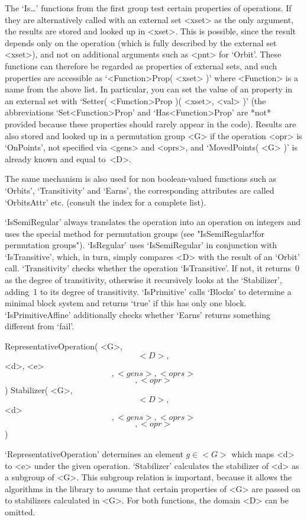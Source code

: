 The `Is\dots'  functions from the first group  test certain properties of
operations. If they are alternatively called  with an external set <xset>
as the only  argument, the results are   stored and looked up  in <xset>.
This is possible,  since the result depends  only on the operation (which
is fully  described by the  external set  <xset>),  and not on additional
arguments such as <pnt>   for `Orbit'. These  functions can  therefore be
regarded as properties of  external sets, and  such {\GAP} properties are
accessible as `<Function>Prop( <xset> )'  where <Function> is a name from
the above list. In particular, you can set the value of an property in an
external   set with `Setter( <Function>Prop    )( <xset>,  <val> )'  (the
abbreviations    `Set<Function>Prop'  and `Has<Function>Prop'   are *not*
provided because these properties   should rarely  appear in  the  code).
Results are also  stored and looked up in  a permutation group <G> if the
operation  <opr> is `OnPoints', not  specified via <gens> and <oprs>, and
`MovedPoints( <G> )' is already known and equal to~<D>.

The same mechanism is also used  for non boolean-valued functions such as
`Orbits', `Transitivity' and `Earns', the corresponding {\GAP} attributes
are called `OrbitsAttr' etc. (consult the index for a complete list).

`IsSemiRegular'  always translates the  operation  into  an operation  on
integers and   uses   the special  method  for  permutation  groups  (see
"IsSemiRegular!for permutation groups"). `IsRegular' uses `IsSemiRegular'
in conjunction  with `IsTransitive', which, in  turn, simply compares <D>
with  the result of an   `Orbit' call. `Transitivity'  checks whether the
operation  `IsTransitive'.    If  not, it returns~0     as  the degree of
transitivity, otherwise   it   recursively looks   at  the  `Stabilizer',
adding~1  to its degree of transitivity.  `IsPrimitive' calls `Blocks' to
determine a minimal block system and returns `true'  if this has only one
block.  `IsPrimitiveAffine'  additionally checks whether  `Earns' returns
something different from `fail'.

\>RepresentativeOperation( <G>, \[ <D>, \] <d>, <e> \[, <gens>, <oprs> %
                           \] \[, <opr> \] )
\>Stabilizer( <G>, \[ <D>, \] <d> \[, <gens>, <oprs> \] \[, <opr> \] )

`RepresentativeOperation' determines an element $g\in <G>$ which maps <d>
to <e> under the  given operation. `Stabilizer' calculates the stabilizer
of <d> as a subgroup of <G>. This subgroup relation is important, because
it allows the algorithms in the library to assume that certain properties
of   <G>  are passed  on  to  stabilizers  calculated  in  <G>. For  both
functions, the domain <D> can be omitted.

